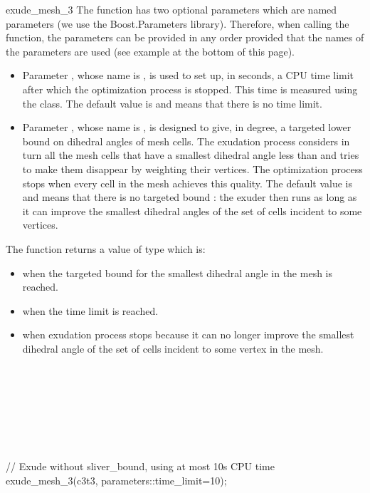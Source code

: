\begin{ccRefFunction}{exude_mesh_3}
The function has two optional parameters which are named parameters (we use the Boost.Parameters library). 
Therefore, when calling the function,  the parameters can be provided in any order 
provided that the names of the parameters are used
 (see example at the bottom of this page). 
\begin{itemize}
\item
Parameter , whose name is ,
 is used to set up, in seconds,
 a CPU time limit after which the optimization process is stopped. This time is
 measured using the  class.
The default value is  and means that there is no time limit.
\item 
Parameter , whose name is ,
is designed to give, in degree,  a targeted
lower bound on dihedral angles of mesh cells.
The exudation process considers in turn all the mesh cells 
that have a smallest dihedral angle less than 
and tries to make them disappear by weighting their vertices.
The optimization process
stops when every cell in the mesh achieves this quality.
The default value is  and means that  there is no targeted bound : 
the exuder then runs as long as
it can improve the smallest dihedral angles of the set of cells
incident to  some vertices.
\end{itemize}




The function \ccRefName{} returns a value of type 
which is:
\begin{itemize}
\item {} when the targeted bound for the smallest dihedral angle in the mesh is reached.
\item{} when the time limit is reached.
\item {} when exudation process stops because it can no longer improve
the smallest dihedral angle of the set of cells incident to some vertex in the mesh.
\end{itemize}

\ccSeeAlso

 \\
 \\
 \\
 \\
 \\
 \\

\ccExample

\begin{ccExampleCode}
// Exude without sliver_bound, using at most 10s CPU time
exude_mesh_3(c3t3, parameters::time_limit=10);
\end{ccExampleCode}


\end{ccRefFunction}

\ccRefPageEnd

